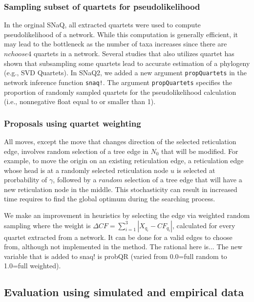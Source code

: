 \documentclass[unnumsec,webpdf,contemporary,large]{oup-authoring-template}%
\theoremstyle{thmstyleone}%
\theoremstyle{thmstyletwo}%
\theoremstyle{thmstylethree}%
\begin{document}
\subsubsection{Sampling subset of quartets for pseudolikelihood}\label{subsubsec3}
In the orginal SNaQ, all extracted quartets were used to compute pseudolikelihood of a network. While this computation is generally efficient, it may lead to the bottleneck as the number of taxa increases since there are $n choose 4$ quartets in a network. Several studies that also utilizes quartet has shown that subsampling some quartets lead to accurate estimation of a phylogeny (e.g., SVD Quartets). In SNaQ2, we added a new argument \texttt{propQuartets} in the network inference function \texttt{snaq!}. The argument \texttt{propQuartets} specifies the proportion of randomly sampled quartets for the pseudolikelihood calculation (i.e., nonnegative float equal to or smaller than 1). 

\subsubsection{Proposals using quartet weighting}\label{subsubsec2}
 All moves, except the move that changes direction of the selected reticulation edge, involves random selection of a tree edge in $N_0$ that will be modified. For example, to move the origin on an existing reticulation edge, a reticulation edge whose head is at a randomly selected reticulation node $u$ is selected at prorbability of $\gamma$, followed by a $random$ selection of a tree edge that will have a new reticulation node in the middle. This stochasticity can result in increased time requires to find the global optimum during the searching process.

We make an improvement in heuristics by selecting the edge via weighted random sampling where the weight is $\Delta CF=\sum^3_{i=1}\left|X_{q_i}-CF_{q_i}\right|$, calculated for every quartet extracted from a network. It can be done for a valid edges to choose from, although not implemented in the method. The rational here is... The new variable that is added to snaq! is probQR (varied from 0.0=full random to 1.0=full weighted).






\subsection{Evaluation using simulated and empirical data}\label{subsec3}
\end{document}
